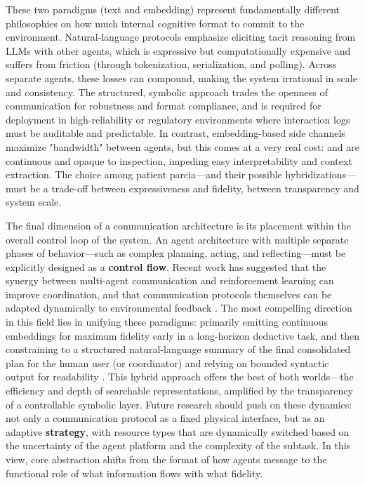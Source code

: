 \documentclass[11pt,a4paper]{article}
\begin{document}
These two paradigms (text and embedding) represent fundamentally different philosophies on how much internal cognitive format to commit to the environment. Natural-language protocols emphasize eliciting tacit reasoning from LLMs with other agents, which is expressive but computationally expensive and suffers from friction (through tokenization, serialization, and polling). Across separate agents, these losses can compound, making the system irrational in scale and consistency. The structured, symbolic approach trades the openness of communication for robustness and format compliance, and is required for deployment in high-reliability or regulatory environments where interaction logs must be auditable and predictable. In contrast, embedding-based side channels maximize "bandwidth" between agents, but this comes at a very real cost: and are continuous and opaque to inspection, impeding easy interpretability and context extraction. The choice among patient parcia---and their possible hybridizations---must be a trade-off between expressiveness and fidelity, between transparency and system scale.

The final dimension of a communication architecture is its placement within the overall control loop of the system. An agent architecture with multiple separate phases of behavior---such as complex planning, acting, and reflecting---must be explicitly designed as a \textbf{control flow}. Recent work has suggested that the synergy between multi-agent communication and reinforcement learning can improve coordination, and that communication protocols themselves can be adapted dynamically to environmental feedback \cite{arxiv:2405.11106v1}. The most compelling direction in this field lies in unifying these paradigms: primarily emitting continuous embeddings for maximum fidelity early in a long-horizon deductive task, and then constraining to a structured natural-language summary of the final consolidated plan for the human user (or coordinator) and relying on bounded syntactic output for readability \cite{arxiv:2402.02716v1}. This hybrid approach offers the best of both worlds---the efficiency and depth of searchable representations, amplified by the transparency of a controllable symbolic layer. Future research should push on these dynamics: not only a communication protocol as a fixed physical interface, but as an adaptive \textbf{strategy}, with resource types that are dynamically switched based on the uncertainty of the agent platform and the complexity of the subtask. In this view, core abstraction shifts from the format of how agents message to the functional role of what information flows with what fidelity.
\end{document}
